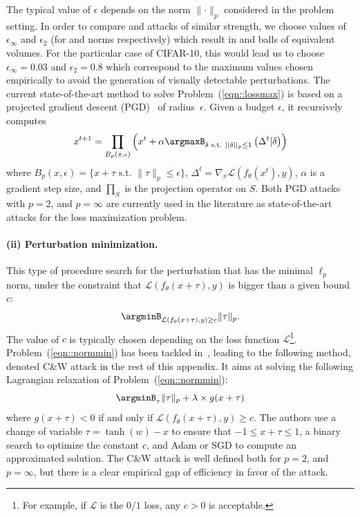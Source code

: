 The typical value of $\epsilon$ depends on the norm $\lVert\cdot\rVert_p$ considered in the problem setting. In order to compare \linf and \ltwo attacks of similar strength, we choose values of $\epsilon_\infty$ and $\epsilon_2$ (for \linf and \ltwo norms respectively) which result in \linf and \ltwo balls of equivalent volumes. For the particular case of CIFAR-10, this would lead us to choose $\epsilon_\infty = 0.03$ and $\epsilon_2 = 0.8$ which correspond to the maximum values chosen empirically to avoid the generation of visually detectable perturbations. 
The current state-of-the-art method to solve Problem~(\ref{eqn::lossmax}) is based on a projected gradient descent (PGD)~\cite{madry2018towards} of radius~$\epsilon$. Given a budget $\epsilon$, it recursively computes
\begin{equation}
    x^{t+1}=\prod_{B_p(x,\epsilon)}\left(x^t
+\alpha \argmaxB_{\delta\text{ s.t. }||\delta||_p\leq1} \left(\Delta^t|\delta \right)\right)
    \label{eqn::projectionPGD}
\end{equation}
where $B_p(x,\epsilon) = \{ x+\tau \text{~s.t.~} \lVert\tau\rVert_p \leq \epsilon\}$, $\Delta^t=\nabla_x\mathcal{L}\left(f_\theta\left(x^t\right),y\right)$, $\alpha$ is a gradient step size, and $\prod_S$ is the projection operator on $S$. Both PGD attacks with $p=2$, and $p=\infty$ are currently used in the literature as state-of-the-art attacks for the loss maximization problem. 


\paragraph{(ii) Perturbation minimization.}  This type of procedure search for the perturbation that has the minimal $\ell_p$ norm, under the constraint that $\mathcal{L}(f_\theta(x+\tau),y)$ is bigger than a given bound $c$:
    \begin{equation}
      \argminB_{\mathcal{L}(f_\theta(x+\tau),y) \geq c} 
      \lVert\tau\rVert_p.
      \label{eqn::normmin}
  \end{equation}
  The value of $c$ is typically chosen depending on the loss function $\mathcal{L}$\footnote{For example, if $\mathcal{L}$ is the $0/1$ loss, any $c>0$ is acceptable.}.
  Problem~(\ref{eqn::normmin}) has been tackled in~\cite{carlini2017towards}, leading to the following method, denoted C\&W attack in the rest of this appendix. It aims at solving the following Lagrangian relaxation of Problem~(\ref{eqn::normmin}):
  \begin{equation}
    \argminB_{\tau} \lVert\tau\rVert_p+ \lambda \times g(x+\tau)
    \label{eqn::CWproblem}
\end{equation}
where $g(x+\tau)<0$ if and only if $\mathcal{L}(f_\theta(x+\tau),y) \geq c$. 
The authors use a change of variable $\tau=\tanh(w)-x$ to ensure that $-1 \leq x+\tau \leq 1$, a binary search to optimize the constant $c$, and Adam or SGD to compute an approximated solution. The C\&W attack is well defined both for $p=2$, and $p=\infty$, but there is a clear empirical gap of efficiency in favor of the \ltwo attack.

